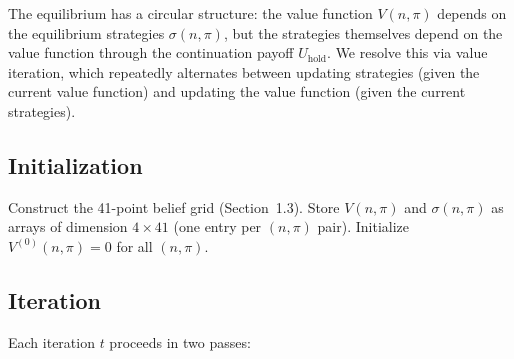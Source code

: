 \documentclass[11pt]{article}
\begin{document}
The equilibrium has a circular structure: the value function $V(n, \pi)$
depends on the equilibrium strategies $\sigma(n, \pi)$, but the strategies
themselves depend on the value function through the continuation payoff
$U_{\text{hold}}$. We resolve this via value iteration, which repeatedly
alternates between updating strategies (given the current value function) and
updating the value function (given the current strategies).

\subsection{Initialization}

Construct the 41-point belief grid (Section~1.3). Store $V(n, \pi)$ and
$\sigma(n, \pi)$ as arrays of dimension $4 \times 41$ (one entry per
$(n, \pi)$ pair). Initialize $V^{(0)}(n, \pi) = 0$ for all $(n, \pi)$.

\subsection{Iteration}

Each iteration $t$ proceeds in two passes:
\end{document}
